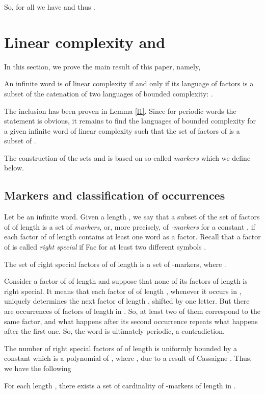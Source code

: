 \documentclass[runningheads,envcountsect,envcountsame]{llncs}
\begin{document}
\medskip
So, for all  we have  and thus .


\section{Linear complexity and }
In this section, we prove the main result of this paper, namely,
\begin{theorem}\label{t:w2} An infinite word is of linear complexity if and only if its language of factors is a subset of the catenation of two languages of bounded complexity:
 .
\end{theorem}
The  inclusion has been proven in Lemma \ref{l1}.
Since for periodic words the statement is obvious, it remains
to find the languages  of bounded complexity for a given infinite word  of
linear complexity  such that the set of factors of  is a subset of .

The construction of the sets   and  is based on so-called {\it markers} which we define below.

\subsection{Markers and classification of occurrences}
Let  be an infinite word. Given a length , we say that a
subset  of the set of factors of  of length  is a set of
{\it markers}, or, more precisely, of {\it -markers} for a
constant , if each factor of  of length  contains at
least one word  as a factor. 
Recall that a factor  of  is called {\it right special} if  Fac for at least two different symbols .
\begin{lemma}
The set of right special factors of  of length  is a set of -markers, where .
\end{lemma}
 Consider a factor  of  of length  and suppose that none of its factors of length  is right special. It means that each factor of  of length , whenever it occurs in , uniquely determines the next factor of length , shifted by one letter. But there are  occurrences of factors of length  in . So, at least two of them correspond to the same factor, and what happens after its second occurrence repeats what happens after the first one. So, the word  is ultimately periodic, a contradiction.  \hfill 

\medskip
The number of right special factors of  of length  is
uniformly bounded by a constant  which is a polynomial of ,
where , due to a result of Cassaigne
\cite{cas_lin,cas_livre}. Thus, we have the following 
\begin{corollary}\label{c:mark}
 For each length , there exists a set of cardinality  of -markers of length  in .
\end{corollary}
\end{document}
